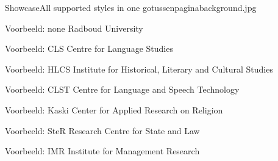\documentclass[department=none, notes={show notes}, slidesperpage=4, official=true, handout]{beamerruhuisstijl}
\begin{document}

\begin{tussenpagina}{Showcase}{All supported styles in one go}{tussenpaginabackground.jpg}
\end{tussenpagina}
\note{}

\renewcommand{\dept}{none}
\begin{frame}
    \titlepage
\end{frame}
\begin{frame}{Voorbeeld: none}
	Radboud University
\end{frame}

\renewcommand{\dept}{cls}
\begin{frame}
    \titlepage
\end{frame}
\begin{frame}{Voorbeeld: CLS}
	Centre for Language Studies
\end{frame}

\renewcommand{\dept}{hlcs}
\begin{frame}
    \titlepage
\end{frame}
\begin{frame}{Voorbeeld: HLCS}
	Institute for Historical, Literary and Cultural Studies
\end{frame}

\renewcommand{\dept}{clst}
\begin{frame}
    \titlepage
\end{frame}
\begin{frame}{Voorbeeld: CLST}
	Centre for Language and Speech Technology
\end{frame}

\renewcommand{\dept}{kaski}
\begin{frame}
    \titlepage
\end{frame}
\begin{frame}{Voorbeeld: Kaski}
	Center for Applied Research on Religion
\end{frame}

\renewcommand{\dept}{ster}
\begin{frame}
    \titlepage
\end{frame}
\begin{frame}{Voorbeeld: SteR}
	Research Centre for State and Law
\end{frame}

\renewcommand{\dept}{imr}
\begin{frame}
    \titlepage
\end{frame}
\begin{frame}{Voorbeeld: IMR}
	Institute for Management Research
\end{frame}
\end{document}
